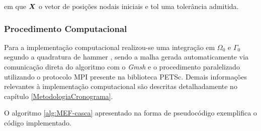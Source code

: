 \noindent em que $\boldsymbol{X}$ o vetor de posições nodais iniciais e tol uma tolerância admitida.

\subsubsection{Procedimento Computacional} \label{MEFP-Comp}

Para a implementação computacional realizou-se uma integração em $\Omega_0$ e $\Gamma_0$ segundo a quadratura de hammer \cite{hammer1956numerical}, sendo a malha gerada automaticamente via comunicação direta do algoritmo com o \textit{Gmsh} e o procedimento paralelizado utilizando o protocolo MPI presente na biblioteca PETSc. Demais informações relevantes à implementação computacional são descritas detalhadamente no capítulo \ref{MetodologiaCronograma}.

O algoritmo \ref{alg:MEF-casca} apresentado na forma de pseudocódigo exemplifica o código implementado.

